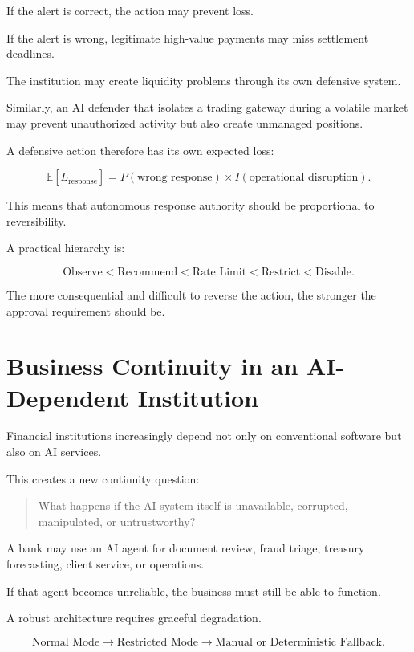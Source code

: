 If the alert is correct, the action may prevent loss.

If the alert is wrong, legitimate high-value payments may miss settlement deadlines.

The institution may create liquidity problems through its own defensive system.

Similarly, an AI defender that isolates a trading gateway during a volatile market may prevent unauthorized activity but also create unmanaged positions.

A defensive action therefore has its own expected loss:

\begin{equation}
\mathbb{E}[L_{\text{response}}]
=
P(\text{wrong response})
\times
I(\text{operational disruption}).
\end{equation}

This means that autonomous response authority should be proportional to reversibility.

A practical hierarchy is:

\begin{equation}
\text{Observe}
<
\text{Recommend}
<
\text{Rate Limit}
<
\text{Restrict}
<
\text{Disable}.
\end{equation}

The more consequential and difficult to reverse the action, the stronger the approval requirement should be.

\section{Business Continuity in an AI-Dependent Institution}

Financial institutions increasingly depend not only on conventional software but also on AI services.

This creates a new continuity question:

\begin{quote}
What happens if the AI system itself is unavailable, corrupted, manipulated, or untrustworthy?
\end{quote}

A bank may use an AI agent for document review, fraud triage, treasury forecasting, client service, or operations.

If that agent becomes unreliable, the business must still be able to function.

A robust architecture requires graceful degradation.

\begin{equation}
\text{Normal Mode}
\rightarrow
\text{Restricted Mode}
\rightarrow
\text{Manual or Deterministic Fallback}.
\end{equation}

